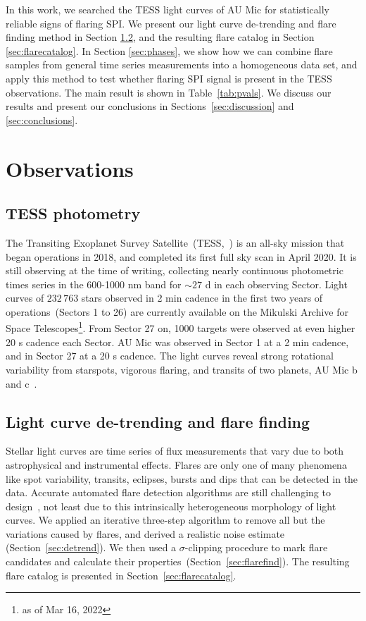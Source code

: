 \documentclass[fleqn,usenatbib]{mnras}%
\begin{document}
In this work, we searched the TESS light curves of AU Mic for statistically reliable signs of flaring SPI. We present our light curve de-trending and flare finding method in Section \ref{sec:detrendfind}, and the resulting flare catalog in Section \ref{sec:flarecatalog}. In Section \ref{sec:phases}, we show how we can combine flare samples from general time series measurements into a homogeneous data set, and apply this method to test whether flaring SPI signal is present in the TESS observations. The main result is shown in Table~\ref{tab:pvals}. We discuss our results and present our conclusions in Sections~\ref{sec:discussion} and \ref{sec:conclusions}.
\section{Observations}
\subsection{TESS photometry}
The Transiting Exoplanet Survey Satellite~(TESS,~\citealt{ricker2014}) is an all-sky mission that began operations in 2018, and completed its first full sky scan in April 2020. It is still observing at the time of writing, collecting nearly continuous photometric times series in the 600-1000 nm band for $\sim 27$ d in each observing Sector. Light curves of $232\,763$ stars observed in 2 min cadence in the first two years of operations~(Sectors 1 to 26) are currently available on the Mikulski Archive for Space Telescopes\footnote{as of Mar 16, 2022}. From Sector 27 on, 1000 targets were observed at even higher 20 s cadence each Sector. AU Mic was observed in Sector 1 at a 2 min cadence, and in Sector 27 at a 20 s cadence. The light curves reveal strong rotational variability from starspots, vigorous flaring, and transits of two planets, AU Mic b and c~\citep{plavchan2020,martioli2021new}.

\subsection{Light curve de-trending and flare finding}
\label{sec:detrendfind}
Stellar light curves are time series of flux measurements that vary due to both astrophysical and instrumental effects. Flares are only one of many phenomena like spot variability, transits, eclipses, bursts and dips that can be detected in the data. Accurate automated flare detection algorithms are still challenging to design~\citep{vida2021}, not least due to this intrinsically heterogeneous morphology of light curves. We applied an iterative three-step algorithm to remove all but the variations caused by flares, and derived a realistic noise estimate (Section~\ref{sec:detrend}). We then used a $\sigma$-clipping procedure to mark flare candidates and calculate their properties~(Section~\ref{sec:flarefind}). The resulting flare catalog is presented in Section~\ref{sec:flarecatalog}.
\end{document}
